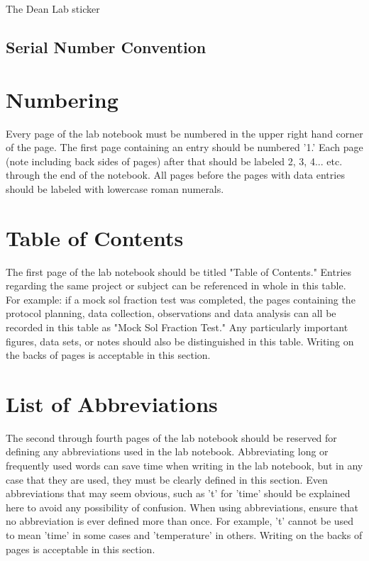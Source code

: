 \documentclass[11pt, oneside]{article}   	%
\begin{document}
The Dean Lab sticker

\subsection[Serial Number Convention]{Serial Number Convention}		%
								


\section{Numbering}

Every page of the lab notebook must be numbered in the upper right hand corner of the page. The first page containing an entry should be numbered '1.' Each page (note including back sides of pages) after that should be labeled 2, 3, 4... etc. through the end of the notebook. All pages before the pages with data entries should be labeled with lowercase roman numerals. 

\section{Table of Contents}

The first page of the lab notebook should be titled "Table of Contents." Entries regarding the same project or subject can be referenced in whole in this table. For example: if a mock sol fraction test was completed, the pages containing the protocol planning, data collection, observations and data analysis can all be recorded in this table as "Mock Sol Fraction Test." Any particularly important figures, data sets, or notes should also be distinguished in this table. Writing on the backs of pages is acceptable in this section.

\section{List of Abbreviations}

The second through fourth pages of the lab notebook should be reserved for defining any abbreviations used in the lab notebook. Abbreviating long or frequently used words can save time when writing in the lab notebook, but in any case that they are used, they must be clearly defined in this section. Even abbreviations that may seem obvious, such as 't' for 'time' should be explained here to avoid any possibility of confusion. When using abbreviations, ensure that no abbreviation is ever defined more than once. For example, 't' cannot be used to mean 'time' in some cases and 'temperature' in others. Writing on the backs of pages is acceptable in this section.
\end{document}
